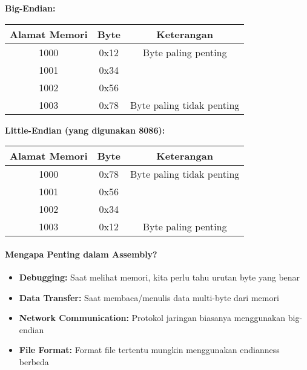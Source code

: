 \documentclass[../main.tex]{subfiles}
\begin{document}
                \textbf{Big-Endian:}
                \begin{center}
                    \begin{tabular}{|c|c|c|}
                        \hline
                        \textbf{Alamat Memori} & \textbf{Byte} & \textbf{Keterangan} \\
                        \hline
                        1000 & 0x12 & Byte paling penting \\
                        1001 & 0x34 & \\
                        1002 & 0x56 & \\
                        1003 & 0x78 & Byte paling tidak penting \\
                        \hline
                    \end{tabular}
                \end{center}

                \textbf{Little-Endian (yang digunakan 8086):}
                \begin{center}
                    \begin{tabular}{|c|c|c|}
                        \hline
                        \textbf{Alamat Memori} & \textbf{Byte} & \textbf{Keterangan} \\
                        \hline
                        1000 & 0x78 & Byte paling tidak penting \\
                        1001 & 0x56 & \\
                        1002 & 0x34 & \\
                        1003 & 0x12 & Byte paling penting \\
                        \hline
                    \end{tabular}
                \end{center}

            \paragraph{Mengapa Penting dalam Assembly?}
                \begin{itemize}
                    \item \textbf{Debugging:} Saat melihat memori, kita perlu tahu urutan byte yang benar
                    \item \textbf{Data Transfer:} Saat membaca/menulis data multi-byte dari memori
                    \item \textbf{Network Communication:} Protokol jaringan biasanya menggunakan big-endian
                    \item \textbf{File Format:} Format file tertentu mungkin menggunakan endianness berbeda
                \end{itemize}
\end{document}
